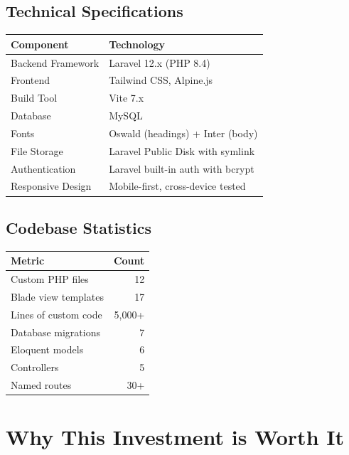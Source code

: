 \documentclass[12pt,a4paper]{article}
\begin{document}
\subsection{Technical Specifications}

\begin{tabular}{ll}
    \toprule
    \textbf{Component} & \textbf{Technology} \\
    \midrule
    Backend Framework & Laravel 12.x (PHP 8.4) \\
    Frontend & Tailwind CSS, Alpine.js \\
    Build Tool & Vite 7.x \\
    Database & MySQL \\
    Fonts & Oswald (headings) + Inter (body) \\
    File Storage & Laravel Public Disk with symlink \\
    Authentication & Laravel built-in auth with bcrypt \\
    Responsive Design & Mobile-first, cross-device tested \\
    \bottomrule
\end{tabular}

\subsection{Codebase Statistics}

\begin{tabular}{lr}
    \toprule
    \textbf{Metric} & \textbf{Count} \\
    \midrule
    Custom PHP files & 12 \\
    Blade view templates & 17 \\
    Lines of custom code & 5,000+ \\
    Database migrations & 7 \\
    Eloquent models & 6 \\
    Controllers & 5 \\
    Named routes & 30+ \\
    \bottomrule
\end{tabular}

\section{Why This Investment is Worth It}
\end{document}
